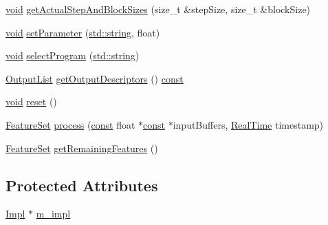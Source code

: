 \begin{DoxyCompactItemize}
\hyperlink{sound_8c_ae35f5844602719cf66324f4de2a658b3}{void} \hyperlink{class_vamp_1_1_host_ext_1_1_plugin_buffering_adapter_aa065985fd864f6869d1bc7fea6fa2ece}{get\+Actual\+Step\+And\+Block\+Sizes} (size\+\_\+t \&step\+Size, size\+\_\+t \&block\+Size)
\item 
\hyperlink{sound_8c_ae35f5844602719cf66324f4de2a658b3}{void} \hyperlink{class_vamp_1_1_host_ext_1_1_plugin_buffering_adapter_a7a979b20c169d37adbd7b7d8b8a077b3}{set\+Parameter} (\hyperlink{test__lib_f_l_a_c_2format_8c_ab02026ad0de9fb6c1b4233deb0a00c75}{std\+::string}, float)
\item 
\hyperlink{sound_8c_ae35f5844602719cf66324f4de2a658b3}{void} \hyperlink{class_vamp_1_1_host_ext_1_1_plugin_buffering_adapter_a3cc7000e0aff525950e0a286b87f8927}{select\+Program} (\hyperlink{test__lib_f_l_a_c_2format_8c_ab02026ad0de9fb6c1b4233deb0a00c75}{std\+::string})
\item 
\hyperlink{class_vamp_1_1_plugin_a30f531b8fb69fac41a24e3d2a6a08ed9}{Output\+List} \hyperlink{class_vamp_1_1_host_ext_1_1_plugin_buffering_adapter_a85a027f5859efb31d315205e234e94c0}{get\+Output\+Descriptors} () \hyperlink{getopt1_8c_a2c212835823e3c54a8ab6d95c652660e}{const} 
\item 
\hyperlink{sound_8c_ae35f5844602719cf66324f4de2a658b3}{void} \hyperlink{class_vamp_1_1_host_ext_1_1_plugin_buffering_adapter_a131fd9fe8a1795d7370d8a721176868a}{reset} ()
\item 
\hyperlink{class_vamp_1_1_plugin_a448fb57dc245d47923ec9eeaf9856c5f}{Feature\+Set} \hyperlink{class_vamp_1_1_host_ext_1_1_plugin_buffering_adapter_a262206b978d9de28ee4bb35f437e915e}{process} (\hyperlink{getopt1_8c_a2c212835823e3c54a8ab6d95c652660e}{const} float $\ast$\hyperlink{getopt1_8c_a2c212835823e3c54a8ab6d95c652660e}{const} $\ast$input\+Buffers, \hyperlink{struct_vamp_1_1_real_time}{Real\+Time} timestamp)
\item 
\hyperlink{class_vamp_1_1_plugin_a448fb57dc245d47923ec9eeaf9856c5f}{Feature\+Set} \hyperlink{class_vamp_1_1_host_ext_1_1_plugin_buffering_adapter_a8771cba75552aaa1340b68de9bf1659c}{get\+Remaining\+Features} ()
\end{DoxyCompactItemize}
\subsection*{Protected Attributes}
\begin{DoxyCompactItemize}
\item 
\hyperlink{class_vamp_1_1_host_ext_1_1_plugin_buffering_adapter_1_1_impl}{Impl} $\ast$ \hyperlink{class_vamp_1_1_host_ext_1_1_plugin_buffering_adapter_a51e10c9c63c0349fd74c6d604de5554e}{m\+\_\+impl}
\end{DoxyCompactItemize}
